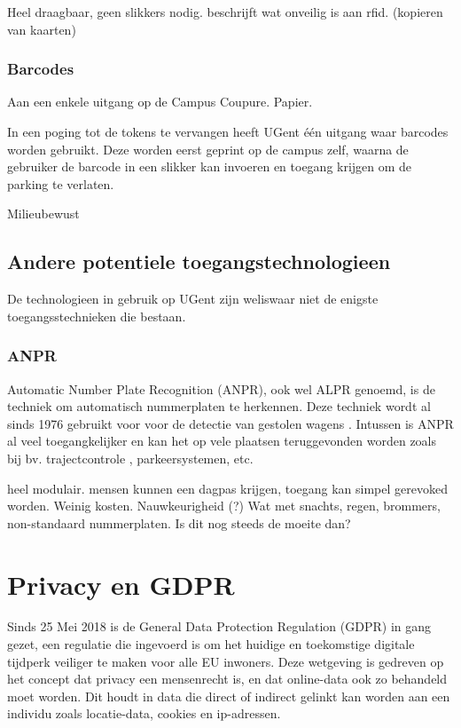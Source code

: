 Heel draagbaar, geen slikkers nodig.
\textcite{aalsalem2015automated} beschrijft wat onveilig is aan rfid. (kopieren van kaarten)

\subsubsection{Barcodes}
Aan een enkele uitgang op de Campus Coupure.
Papier.

In een poging tot de tokens te vervangen heeft UGent één uitgang waar barcodes worden gebruikt. Deze worden eerst geprint op de campus zelf, waarna de gebruiker de barcode in een slikker kan invoeren en toegang krijgen om de parking te verlaten.


Milieubewust

\subsection{Andere potentiele toegangstechnologieen}
De technologieen in gebruik op UGent zijn weliswaar niet de enigste toegangsstechnieken die bestaan.

\subsubsection{ANPR}

Automatic Number Plate Recognition (ANPR), ook wel ALPR genoemd, is de techniek om automatisch nummerplaten te herkennen. Deze techniek wordt al sinds 1976 gebruikt voor voor de detectie van gestolen wagens \autocite{uk2011anpr}. Intussen is ANPR al veel toegangkelijker en kan het op vele plaatsen teruggevonden worden zoals bij bv. trajectcontrole \autocite{de2014snelheidscamera}, parkeersystemen, etc.
\par
heel modulair. mensen kunnen een dagpas krijgen, toegang kan simpel gerevoked worden. Weinig kosten. Nauwkeurigheid (?)
Wat met snachts, regen, brommers, non-standaard nummerplaten. Is dit nog steeds de moeite dan?

\section{Privacy en GDPR}
\label{sec:privacy-en-gdpr}

Sinds 25 Mei 2018 is de General Data Protection Regulation (GDPR) in gang gezet, een regulatie die ingevoerd is om het huidige  en toekomstige digitale tijdperk veiliger te maken voor alle EU inwoners.
Deze wetgeving is gedreven op het concept dat privacy een mensenrecht is, en dat online-data ook zo behandeld moet worden. Dit houdt in data die direct of indirect gelinkt kan worden aan een individu zoals locatie-data, cookies en ip-adressen.\autocite{goddard2017eu}


